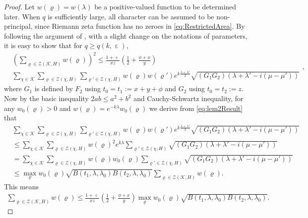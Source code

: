 \documentclass[10pt, reqno]{amsart}
\numberwithin{equation}{section}
\newcommand{\bb}[1]{\left(#1\right)}
\renewcommand{\epsilon }{\operatorname{\varepsilon}}
\renewcommand{\rho }{\operatorname{\varrho}}
\begin{document}
\begin{proof}
Let $w(\rho)=w(\lambda )$ be a positive-valued function to be determined later. When $q$ is sufficiently large, all character can be assumed to be non-principal, since Riemann zeta function has no zeroes in \eqref{eq:RestrictedArea}. By following the argument of \cite[Page 19-25]{Pintz2018}, with a slight change on the notations of parameters, it is easy to show that for $q\geq q(k,\epsilon)$,
\begin{equation}\label{eq:KeyInequality}
\begin{split}
&\bb{\sum_{\rho \in \mathcal{Z}(\mathcal{K},H)}w(\rho)}^2\leq \frac{1+\epsilon}{xz}\bb{\frac{1}{2}+\frac{\phi+x}{y}} \\
&\sum_{\chi\in \mathcal{K}}\sum_{\rho \in \mathcal{Z}(\chi,H)}\sum_{\rho' \in \mathcal{Z}(\chi,H)}w(\rho) w(\rho') e^{k\frac{\lambda+\lambda'}{2}}\sqrt{(G_1G_2)(\lambda+\lambda'-i(\mu-\mu'))}
\end{split},
\end{equation}
where $G_1$ is defined by $F_2$ using $t_0=t_1:=x+y+\phi$ and $G_2$ using $t_0=t_2:=z$.
Now by the basic inequality $2ab\leq a^2+b^2$ and Cauchy-Schwartz inequality, for any $w_0(\rho)>0$ and $w(\rho)=e^{-k\lambda}w_0(\rho)$ we derive from \eqref{eq:lem2Result} that
\begin{equation}\label{eq:CauchySchwartz}
\begin{split}
&\sum_{\chi\in \mathcal{K}}\sum_{\rho \in \mathcal{Z}(\chi,H)}\sum_{\rho' \in \mathcal{Z}(\chi,H)}w(\rho) w(\rho') e^{k\frac{\lambda+\lambda'}{2}}\sqrt{(G_1G_2)(\lambda+\lambda'-i(\mu-\mu'))} \\
& \leq \sum_{\chi\in \mathcal{K}}\sum_{\rho \in \mathcal{Z}(\chi,H)}w(\rho)^2 e^{k\lambda}\sum_{\rho' \in \mathcal{Z}(\chi,H)}\sqrt{(G_1G_2)(\lambda+\lambda'-i(\mu-\mu'))} \\
&= \sum_{\chi\in \mathcal{K}}\sum_{\rho \in \mathcal{Z}(\chi,H)}w(\rho)w_0(\rho) \sum_{\rho' \in \mathcal{Z}(\chi,H)}\sqrt{(G_1G_2)(\lambda+\lambda'-i(\mu-\mu'))} \\
& \leq \max_{\rho}w_0(\rho)\sqrt{B(t_1,\lambda,\lambda_0) B(t_2,\lambda,\lambda_0)}\sum_{\rho\in \mathcal{Z}(\mathcal{K},H)}w(\rho).
\end{split}
\end{equation}
This means
\begin{equation}\label{eq:Simplified}
\begin{split}
\sum_{\rho \in \mathcal{Z}(\mathcal{K},H)}w(\rho)\leq \frac{1+\epsilon}{xz}\bb{\frac{1}{2}+\frac{\phi+x}{y}}\max_{\rho}w_0(\rho) \sqrt{B(t_1,\lambda,\lambda_0)B(t_2,\lambda,\lambda_0)}.

\end{split}
\end{equation}
\end{proof}
\end{document}
